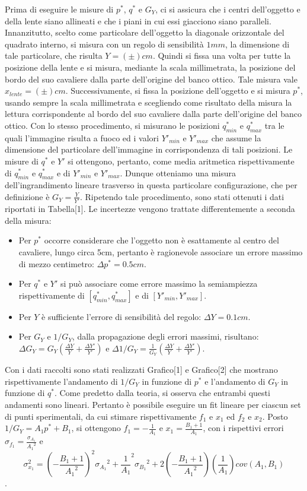 \documentclass{article}
\begin{document}
	Prima di eseguire le misure di $p^*$, $q^*$ e $G_Y$, ci si assicura che i centri dell'oggetto e della lente siano allineati e che i piani in cui essi giacciono siano paralleli. Innanzitutto, scelto come particolare dell'oggetto la diagonale orizzontale del quadrato interno, si misura con un regolo di sensibilità $1mm$, la dimensione di tale particolare, che risulta $Y=(\pm)cm$. Quindi si fissa una volta per tutte la posizione della lente e si misura, mediante la scala millimetrata, la posizione del bordo del suo cavaliere dalla parte dell'origine del banco ottico. Tale misura vale $x_{lente}=(\pm)cm$. Successivamente, si fissa la posizione dell'oggetto e si misura $p^*$, usando sempre la scala millimetrata e scegliendo come risultato della misura la lettura corrispondente al bordo del suo cavaliere dalla parte dell'origine del banco ottico. Con lo stesso procedimento, si misurano le posizioni $q^*_{min}$ e $q^*_{max}$ tra le quali l'immagine risulta a fuoco ed i valori $Y'_{min}$ e $Y'_{max}$ che assume la dimensione del particolare dell'immagine in corrispondenza di tali posizioni. 
	Le misure di $q^*$ e $Y'$ si ottengono, pertanto, come media aritmetica rispettivamente di $q^*_{min}$ e $q^*_{max}$ e di $Y'_{min}$ e $Y'_{max}$. Dunque otteniamo una misura dell'ingrandimento lineare trasverso in questa particolare configurazione, che per definizione è $G_Y = \frac{Y}{Y'}$. Ripetendo tale procedimento, sono stati ottenuti i dati riportati in Tabella[1]. Le incertezze vengono trattate differentemente a seconda della misura:
	\begin{itemize}
		\item Per $p^*$ occorre considerare che l'oggetto non è esattamente al centro del cavaliere, lungo circa 5cm, pertanto è ragionevole associare un errore massimo di mezzo centimetro: $\Delta p^* = 0.5 cm$.
		\item Per $q^*$ e $Y'$ si può associare come errore massimo la semiampiezza rispettivamente di $[q^*_{min},q^*_{max}]$ e di $[Y'_{min},Y'_{max}]$.
		\item Per $Y$ è sufficiente l'errore di sensibilità del regolo: $\Delta Y = 0.1 cm$.
		\item Per $G_Y$ e $1/G_Y$, dalla propagazione degli errori massimi, risultano: $\Delta G_Y = G_Y (\frac{\Delta Y}{Y}+\frac{\Delta Y'}{Y'})$ e
		$\Delta 1/G_Y = \frac{1}{G_Y} (\frac{\Delta Y}{Y}+\frac{\Delta Y'}{Y'})$.
	\end{itemize}
	Con i dati raccolti sono stati realizzati Grafico[1] e Grafico[2] che mostrano rispettivamente l'andamento di $1/G_Y$ in funzione di $p^*$ e l'andamento di $G_Y$ in funzione di $q^*$. Come predetto dalla teoria, si osserva che entrambi questi andamenti sono lineari. Pertanto è possibile eseguire un fit lineare per ciascun set di punti sperimentali, da cui stimare rispettivamente $f_1$ e $x_1$ ed $f_2$ e $x_2$.
	Posto $1/G_Y = A_1 p^* + B_1$, si ottengono $f_1 = -\frac{1}{A_1}$ e $x_1 = \frac{B_1 + 1}{A_1}$, con i rispettivi errori $\sigma_{f_1} = \frac{\sigma_{A_1}}{{A_1}^2}$ e $$\sigma_{x_1}^2 = (-\frac{B_1+1}{{A_1}^2})^2 {\sigma_{A_1}}^2 + %
	 {\frac{1}{A_1}}^2{\sigma_{B_1}}^2 + %
	 2 (-\frac{B_1+1}{{A_1}^2}) (\frac{1}{A_1}) cov(A_1,B_1)$$. %
	
\end{document}
